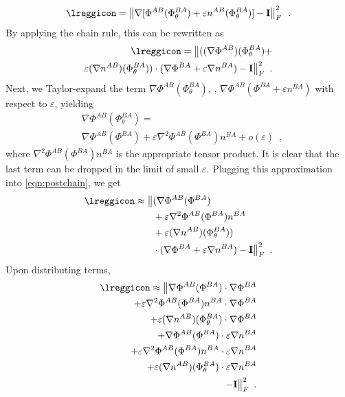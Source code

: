 \begin{equation}
	\lreggicon = \left\| \nabla[\Phi^{AB} (\Phi_\theta^{BA}) + \varepsilon n^{AB}(\Phi_\theta^{BA})] -  \mathbf{I} \right\|^2_F\enspace.
\end{equation}
By applying the chain rule, this can be rewritten as
\begin{equation}
	\begin{split}
		\lreggicon = \bigl\|((\nabla\Phi^{AB})(\Phi_\theta^{BA}) + \\
		\varepsilon (\nabla n^{AB}) (\Phi_\theta^{BA})) \cdot (\nabla\Phi^{BA} + \varepsilon \nabla n^{BA}) - \mathbf{I}\bigr\|_F^2\enspace.
		\label{eqn:postchain}
	\end{split}
\end{equation}
Next, we Taylor-expand the term $\nabla \Phi^{AB}(\Phi_\theta^{BA})$, \ie, $\nabla \Phi^{AB} (\Phi^{BA} + \varepsilon n^{BA})$  with respect to $\varepsilon$, yielding
\begin{equation}
	\begin{split}
		& \nabla \Phi^{AB}(\Phi^{BA}_\theta) = \\
		& \nabla \Phi^{AB}(\Phi^{BA}) + \varepsilon \nabla^2 \Phi^{AB}(\Phi^{BA}) n^{BA} + o(\varepsilon)\enspace,
	\end{split}
\end{equation}
where $\nabla^2\Phi^{AB}(\Phi^{BA})n^{BA}$ is the appropriate tensor product.
It is clear that the last term can be dropped in the limit of small $\varepsilon$. Plugging this approximation into \ref{eqn:postchain},
we get
\begin{equation}
	\begin{split}
		\lreggicon \approx \bigl\| & (
		\nabla \Phi^{AB}(\Phi^{BA}) \\
		& + \varepsilon \nabla^2 \Phi^{AB}(\Phi^{BA}) n^{BA} \\
		& + \varepsilon (\nabla n^{AB}) (\Phi_\theta^{BA}))\\
		& \cdot (\nabla\Phi^{BA} + \varepsilon \nabla n^{BA}) - \mathbf{I}\bigr\|_F^2\enspace.
	\end{split}
\end{equation}
Upon distributing terms,
\begin{equation}
	\begin{split}
		\lreggicon \approx \bigl\|
		\nabla \Phi^{AB}(\Phi^{BA}) \cdot \nabla\Phi^{BA}  \\~+
		\varepsilon \nabla^2 \Phi^{AB}(\Phi^{BA}) n^{BA} \cdot \nabla\Phi^{BA} \\~+
		\varepsilon (\nabla n^{AB}) (\Phi_\theta^{BA}) \cdot \nabla\Phi^{BA}  \\~+
		\nabla \Phi^{AB}(\Phi^{BA}) \cdot \varepsilon \nabla n^{BA} \\~+
		\varepsilon \nabla^2 \Phi^{AB}(\Phi^{BA}) n^{BA} \cdot \varepsilon \nabla n^{BA} \\~+
		\varepsilon (\nabla n^{AB}) (\Phi_\theta^{BA}) \cdot \varepsilon \nabla n^{BA}  \\
		- \mathbf{I}\bigr\|_F^2\enspace.
	\end{split}
\end{equation}
